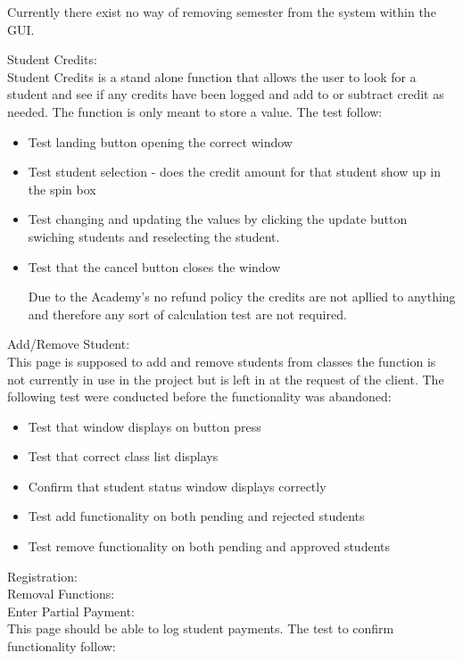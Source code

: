Currently there exist no way of removing semester from the system within the GUI.

Student Credits:\\
Student Credits is a stand alone function that allows the user to look for a student and see if any credits have been logged and add to or subtract credit as needed. The function is only meant to store a value. The test follow:

\begin{itemize}
\item Test landing button opening the correct window
\item Test student selection - does the credit amount for that student show up in the spin box
\item Test changing and updating the values by clicking the update button swiching students and reselecting the student.
\item Test that the cancel button closes the window

Due to the Academy's no refund policy the credits are not apllied to anything and therefore any sort of calculation test are not required.
\end{itemize}

Add/Remove Student:\\
This page is supposed to add and remove students from classes the function is not currently in use in the project but is left in at the request of the client. The following test were conducted before the functionality was abandoned:

\begin{itemize}
\item Test that window displays on button press
\item Test that correct class list displays
\item Confirm that student status window displays correctly
\item Test add functionality on both pending and rejected students
\item Test remove functionality on both pending and approved students
\end{itemize}

Registration:\\


Removal Functions:\\


Enter Partial Payment:\\
This page should be able to log student payments. The test to confirm functionality follow:

